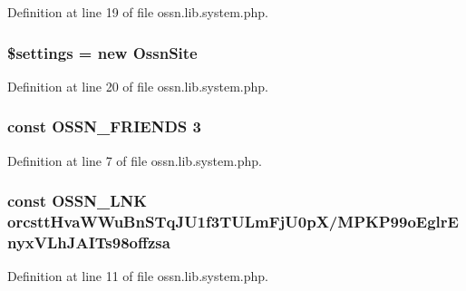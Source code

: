 Definition at line 19 of file ossn.\+lib.\+system.\+php.

\subsubsection[{\texorpdfstring{\$settings}{$settings}}]{\setlength{\rightskip}{0pt plus 5cm}\$settings = new {\bf Ossn\+Site}}\hypertarget{ossn_8lib_8system_8php_ac7c3353107070daa85f641882931b358}{}\label{ossn_8lib_8system_8php_ac7c3353107070daa85f641882931b358}


Definition at line 20 of file ossn.\+lib.\+system.\+php.

\subsubsection[{\texorpdfstring{O\+S\+S\+N\+\_\+\+F\+R\+I\+E\+N\+DS}{OSSN_FRIENDS}}]{\setlength{\rightskip}{0pt plus 5cm}const O\+S\+S\+N\+\_\+\+F\+R\+I\+E\+N\+DS 3}\hypertarget{ossn_8lib_8system_8php_a524966d71b147c822336d02f87ab9ece}{}\label{ossn_8lib_8system_8php_a524966d71b147c822336d02f87ab9ece}


Definition at line 7 of file ossn.\+lib.\+system.\+php.

\subsubsection[{\texorpdfstring{O\+S\+S\+N\+\_\+\+L\+NK}{OSSN_LNK}}]{\setlength{\rightskip}{0pt plus 5cm}const O\+S\+S\+N\+\_\+\+L\+NK \textquotesingle{}orcstt\+Hva\+W\+Wu\+Bn\+S\+Tq\+J\+U1f3\+T\+U\+Lm\+Fj\+U0pX/M\+P\+K\+P99o\+Eglr\+Enyx\+V\+Lh\+J\+A\+I\+Ts98offzsa\textquotesingle{}}\hypertarget{ossn_8lib_8system_8php_a8055fb49b3bb3a37d8d9d5f037d196c3}{}\label{ossn_8lib_8system_8php_a8055fb49b3bb3a37d8d9d5f037d196c3}


Definition at line 11 of file ossn.\+lib.\+system.\+php.

